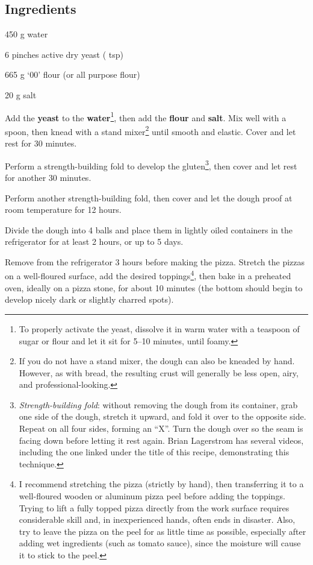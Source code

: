 \newpage
{}

\subsection*{Ingredients}
\begin{ingredients}
	\item 450 g water
	\item 6 pinches active dry yeast ( tsp)
	\item 665 g `00' flour (or all purpose flour)
	\item 20 g salt
\end{ingredients}

\medskip

Add the \textbf{yeast} to the \textbf{water}\footnote{To properly activate the yeast, dissolve it in warm water with a teaspoon of sugar or flour and let it sit for 5--10 minutes, until foamy.}, then add the \textbf{flour} and \textbf{salt}.
Mix well with a spoon, then knead with a stand mixer\footnote{If you do not have a stand mixer, the dough can also be kneaded by hand. However, as with bread, the resulting crust will generally be less open, airy, and professional-looking.} until smooth and elastic.
Cover and let rest for 30 minutes.

Perform a strength-building fold to develop the gluten\footnote{\textit{Strength-building fold}: without removing the dough from its container, grab one side of the dough, stretch it upward, and fold it over to the opposite side. Repeat on all four sides, forming an ``X''. Turn the dough over so the seam is facing down before letting it rest again. Brian Lagerstrom has several videos, including the one linked under the title of this recipe, demonstrating this technique.\label{fn:strength_building_fold}}, then cover and let rest for another 30 minutes.

Perform another strength-building fold, then cover and let the dough proof at room temperature for 12 hours. 

Divide the dough into 4 balls and place them in lightly oiled containers in the refrigerator for at least 2 hours, or up to 5 days. 

Remove from the refrigerator 3 hours before making the pizza.
Stretch the pizzas on a well-floured surface, add the desired toppings\footnote{I recommend stretching the pizza (strictly by hand), then transferring it to a well-floured wooden or aluminum pizza peel before adding the toppings. Trying to lift a fully topped pizza directly from the work surface requires considerable skill and, in inexperienced hands, often ends in disaster. Also, try to leave the pizza on the peel for as little time as possible, especially after adding wet ingredients (such as tomato sauce), since the moisture will cause it to stick to the peel.}, then bake in a preheated oven, ideally on a pizza stone, for about 10 minutes (the bottom should begin to develop nicely dark or slightly charred spots).

